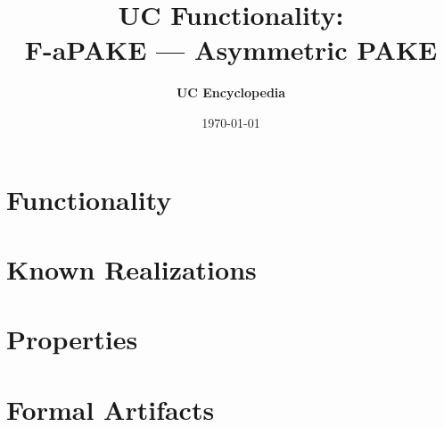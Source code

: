 \documentclass[11pt,a4paper]{article}
\title{\textbf{\Large UC Functionality:}\\[0.2em] \Large F-aPAKE --- Asymmetric PAKE}
\author{\textbf{UC Encyclopedia}}
\date{\today}
\newtheorem{functionality}{Functionality}
\begin{document}
\maketitle

\begin{abstract}
\end{abstract}

\section{Functionality}

%

\section{Known Realizations}


\section{Properties}


\section{Formal Artifacts}

\end{document}

